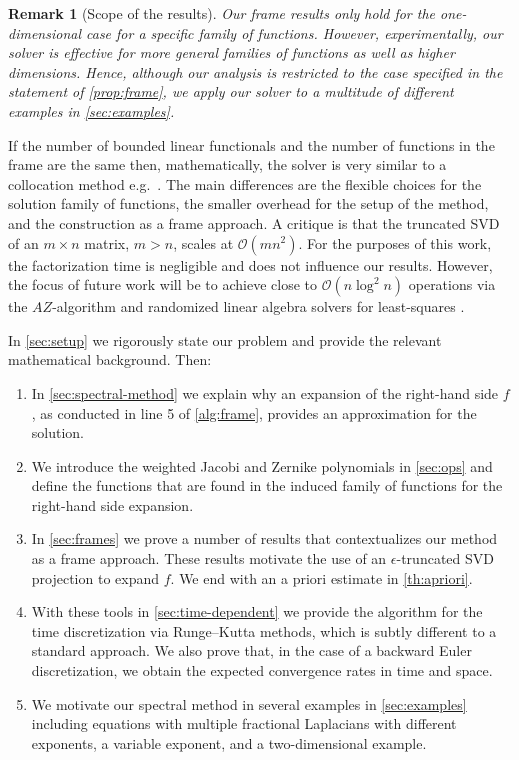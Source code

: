 \documentclass[10pt,a4paper]{article}
\newtheorem{remark}{Remark}[section]
\numberwithin{equation}{section}
\begin{document}
\begin{remark}[Scope of the results]
Our frame results only hold for the one-dimensional case for a specific family of functions. However, experimentally, our solver is effective for more general families of functions as well as higher dimensions. Hence, although our analysis is restricted to the case specified in the statement of  \cref{prop:frame}, we apply our solver to a multitude of different examples in \cref{sec:examples}.
\end{remark}


If the number of bounded linear functionals and the number of functions in the frame are the same then, mathematically, the solver is very similar to a collocation method e.g.~\cite{Tang2018, Tang2020}. The main differences are the flexible choices for the solution family of functions, the smaller overhead for the setup of the method, and the construction as a frame approach. A critique is that the truncated SVD of an $m \times n$ matrix, $m > n$, scales at $\mathcal{O}(mn^2)$. For the purposes of this work, the factorization time is negligible and does not influence our results. However, the focus of future work will be to achieve close to $\mathcal{O}(n\log^2 n)$ operations via the $AZ$-algorithm \cite{Coppe2020} and randomized linear algebra solvers for least-squares \cite{Halko2011, Meier2022, Meier2023}.


In \cref{sec:setup} we rigorously state our problem and provide the relevant mathematical background. Then:
\begin{enumerate}
\itemsep=0pt
\item In \cref{sec:spectral-method} we explain why an expansion of the right-hand side $f$, as conducted in line 5 of \cref{alg:frame}, provides an approximation for the solution.
\item We introduce the weighted Jacobi and Zernike polynomials in \cref{sec:ops} and define the functions that are found in the induced family of functions for the right-hand side expansion.
\item In \cref{sec:frames} we prove a number of results that contextualizes our method as a frame approach. These results motivate the use of an $\epsilon$-truncated SVD projection to expand $f$. We end with an a priori estimate in \cref{th:apriori}.
\item With these tools in \cref{sec:time-dependent} we provide the algorithm for the time discretization via Runge--Kutta methods, which is subtly different to a standard approach. We also prove that, in the case of a backward Euler discretization, we obtain the expected convergence rates in time and space.
\item We motivate our spectral method in several examples in \cref{sec:examples} including equations with multiple fractional Laplacians with different exponents, a variable exponent, and a two-dimensional example.
\end{enumerate}
\end{document}
